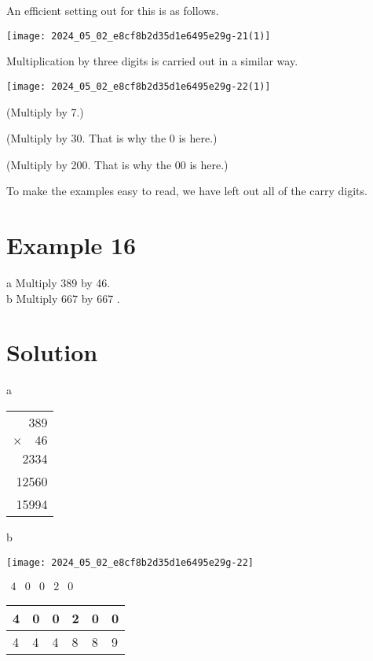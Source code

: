 \documentclass[10pt]{article}
\begin{document}
An efficient setting out for this is as follows.

\begin{center}
\texttt{[image: 2024\_05\_02\_e8cf8b2d35d1e6495e29g-21(1)]}
\end{center}

Multiplication by three digits is carried out in a similar way.

\begin{center}
\texttt{[image: 2024\_05\_02\_e8cf8b2d35d1e6495e29g-22(1)]}
\end{center}

(Multiply by 7.)

(Multiply by 30. That is why the 0 is here.)

(Multiply by 200. That is why the 00 is here.)

To make the examples easy to read, we have left out all of the carry digits.

\section*{Example 16}
a Multiply 389 by 46.\\
b Multiply 667 by 667 .

\section*{Solution}
a

\begin{center}
\begin{tabular}{r}
389 \\
\(\times \quad 46\) \\
\hline
2334 \\
12560 \\
\hline
15994 \\
\hline
\end{tabular}
\end{center}

b

\begin{center}
\texttt{[image: 2024\_05\_02\_e8cf8b2d35d1e6495e29g-22]}
\end{center}

\(\begin{array}{llllll}4 & 0 & 0 & 2 & 0\end{array}\)

\begin{center}
\begin{tabular}{llllll}
4 & 0 & 0 & 2 & 0 & 0 \\
\hline
4 & 4 & 4 & 8 & 8 & 9 \\
\hline
\end{tabular}
\end{center}
\end{document}
